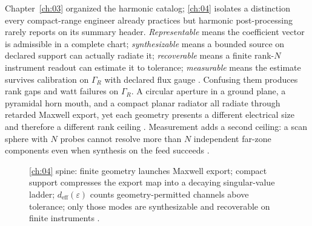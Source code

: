 
Chapter~\ref{ch:03} organized the harmonic catalog; \ref{ch:04} isolates a distinction every compact-range engineer already practices but harmonic post-processing rarely reports on its summary header. \emph{Representable} means the coefficient vector is admissible in a complete chart; \emph{synthesizable} means a bounded source on declared support can actually radiate it; \emph{recoverable} means a finite rank-$N$ instrument readout can estimate it to tolerance; \emph{measurable} means the estimate survives calibration on $\Gamma_R$ with declared flux gauge \cite{stratton1941}. Confusing them produces rank gaps and watt failures on $\Gamma_R$. A circular aperture in a ground plane, a pyramidal horn mouth, and a compact planar radiator all radiate through retarded Maxwell export, yet each geometry presents a different electrical size and therefore a different rank ceiling \cite{collin2001}. Measurement adds a second ceiling: a scan sphere with $N$ probes cannot resolve more than $N$ independent far-zone components even when synthesis on the feed succeeds \cite{harrington2001}.

\begin{figure}[t]
\centering
{}
\caption{\ref{ch:04} spine: finite geometry launches Maxwell export; compact support compresses the export map into a decaying singular-value ladder; $d_{\mathrm{eff}}(\varepsilon)$ counts geometry-permitted channels above tolerance; only those modes are synthesizable and recoverable on finite instruments \cite{maxwell1873}.}
\label{fig:ch4.master-revision-spine}
\end{figure}


